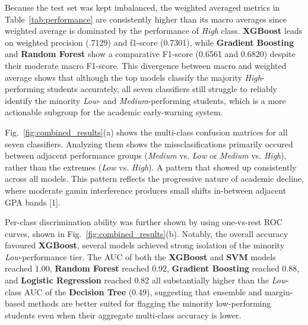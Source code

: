 \documentclass[conference]{IEEEtran}
\begin{document}
 Because the test set was kept imbalanced, the weighted averaged metrics in Table~\ref{tab:performance} are consistently higher than its macro averages since weighted average is dominated by the performance of \textit{High} class. \textbf{XGBoost} leads on weighted precision (.7129) and f1-score (0.7301), while \textbf{Gradient Boosting} and \textbf{Random Forest} show a comparative F1-score (0.6561 and 0.6820) despite their moderate macro F1-score. This divergence between macro and weighted average shows that although the top models classify the majority \textit{High}-performing students accurately, all seven classifiers still struggle to reliably identify the minority \textit{Low}- and \textit{Medium}-performing students, which is a more actionable subgroup for the academic early-warning system.

Fig.~\ref{fig:combined_results}(a) shows the multi-class confusion matrices for all seven classifiers. Analyzing them shows the missclasifications primarily occured between adjacent performance groups (\textit{Medium} vs. \textit{Low} or \textit{Medium} vs. \textit{High}), rather than the extremes (\textit{Low} vs. \textit{High}). A pattern that showed up consistently across all models. This pattern reflects the progressive nature of academic decline, where moderate gamin interference produces small shifts in-between adjacent GPA bands [1].

Per-class discrimination ability was further shown by using one-vs-rest ROC curves, shown in Fig.~\ref{fig:combined_results}(b). Notably, the overall accuracy favoured \textbf{XGBoost}, several models achieved strong isolation of the minority \textit{Low}-performance tier. The AUC of both the \textbf{XGBoost} and \textbf{SVM} models reached 1.00, \textbf{Random Forest} reached 0.92, \textbf{Gradient Boosting} reached 0.88, and \textbf{Logistic Regression} reached 0.82 all substantially higher than the \textit{Low}-class AUC of the \textbf{Decision Tree} (0.49), suggesting that ensemble and margin-based methods are better suited for flagging the minority low-performing students even when their aggregate multi-class accuracy is lower.
\end{document}
